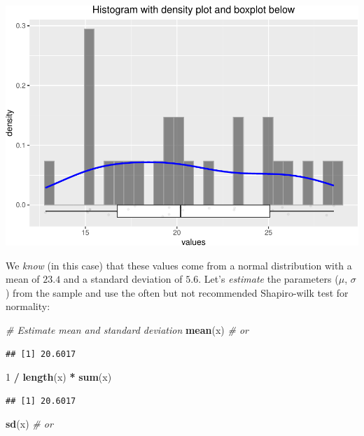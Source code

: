 \documentclass[
]{book}
\newenvironment{Shaded}{\begin{snugshade}}{\end{snugshade}}
\newcommand{\CommentTok}[1]{\textcolor[rgb]{0.56,0.35,0.01}{\textit{#1}}}
\newcommand{\DecValTok}[1]{\textcolor[rgb]{0.00,0.00,0.81}{#1}}
\newcommand{\FunctionTok}[1]{\textcolor[rgb]{0.13,0.29,0.53}{\textbf{#1}}}
\newcommand{\NormalTok}[1]{#1}
\newcommand{\SpecialCharTok}[1]{\textcolor[rgb]{0.81,0.36,0.00}{\textbf{#1}}}
\newcommand{\pandocbounded}[1]{#1}
\begin{document}
\pandocbounded{\includegraphics[keepaspectratio]{_main_files/figure-latex/unnamed-chunk-18-1.pdf}}

We \emph{know} (in this case) that these values come from a normal distribution with a mean
of \(23.4\) and a standard deviation of \(5.6\). Let's \emph{estimate} the parameters (\(\mu\), \(\sigma\)) from the sample
and use the often but not recommended Shapiro-wilk test for normality:

\begin{Shaded}
\begin{Highlighting}[]
\CommentTok{\# Estimate mean and standard deviation}
\FunctionTok{mean}\NormalTok{(x) }\CommentTok{\# or}
\end{Highlighting}
\end{Shaded}

\begin{verbatim}
## [1] 20.6017
\end{verbatim}

\begin{Shaded}
\begin{Highlighting}[]
\DecValTok{1} \SpecialCharTok{/} \FunctionTok{length}\NormalTok{(x) }\SpecialCharTok{*} \FunctionTok{sum}\NormalTok{(x)}
\end{Highlighting}
\end{Shaded}

\begin{verbatim}
## [1] 20.6017
\end{verbatim}

\begin{Shaded}
\begin{Highlighting}[]
\FunctionTok{sd}\NormalTok{(x) }\CommentTok{\# or}
\end{Highlighting}
\end{Shaded}
\end{document}
